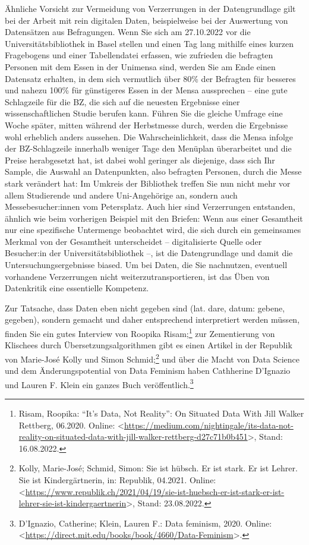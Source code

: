 \documentclass[
  letterpaper,
]{book}
\begin{document}
Ähnliche Vorsicht zur Vermeidung von Verzerrungen in der Datengrundlage
gilt bei der Arbeit mit rein digitalen Daten, beispielweise bei der
Auswertung von Datensätzen aus Befragungen. Wenn Sie sich am 27.10.2022
vor die Universitätsbibliothek in Basel stellen und einen Tag lang
mithilfe eines kurzen Fragebogens und einer Tabellendatei erfassen, wie
zufrieden die befragten Personen mit dem Essen in der Unimensa sind,
werden Sie am Ende einen Datensatz erhalten, in dem sich vermutlich über
80\% der Befragten für besseres und nahezu 100\% für günstigeres Essen
in der Mensa aussprechen -- eine gute Schlagzeile für die BZ, die sich
auf die neuesten Ergebnisse einer wissenschaftlichen Studie berufen
kann. Führen Sie die gleiche Umfrage eine Woche später, mitten während
der Herbstmesse durch, werden die Ergebnisse wohl erheblich anders
aussehen. Die Wahrscheinlichkeit, dass die Mensa infolge der
BZ-Schlagzeile innerhalb weniger Tage den Menüplan überarbeitet und die
Preise herabgesetzt hat, ist dabei wohl geringer als diejenige, dass
sich Ihr Sample, die Auswahl an Datenpunkten, also befragten Personen,
durch die Messe stark verändert hat: Im Umkreis der Bibliothek treffen
Sie nun nicht mehr vor allem Studierende und andere Uni-Angehörige an,
sondern auch Messebesucher:innen vom Petersplatz. Auch hier sind
Verzerrungen entstanden, ähnlich wie beim vorherigen Beispiel mit den
Briefen: Wenn aus einer Gesamtheit nur eine spezifische Untermenge
beobachtet wird, die sich durch ein gemeinsames Merkmal von der
Gesamtheit unterscheidet -- digitalisierte Quelle oder Besucher:in der
Universitätsbibliothek --, ist die Datengrundlage und damit die
Untersuchungsergebnisse biased. Um bei Daten, die Sie nachnutzen,
eventuell vorhandene Verzerrungen nicht weiterzutransportieren, ist das
Üben von Datenkritik eine essentielle Kompetenz.

Zur Tatsache, dass Daten eben nicht gegeben sind (lat. dare, datum:
gebene, gegeben), sondern gemacht und daher entsprechend interpretiert
werden müssen, finden Sie ein gutes Interview von Roopika
Risam;\footnote{Risam, Roopika: {``}{It}{'}s {Data}, {Not}
  {Reality}{''}: {On} {Situated} {Data} {With} {Jill} {Walker}
  {Rettberg}, 06.2020. Online:
  \textless{}\url{https://medium.com/nightingale/its-data-not-reality-on-situated-data-with-jill-walker-rettberg-d27c71b0b451}\textgreater,
  Stand: 16.08.2022.} zur Zementierung von Klischees durch
Übersetzungsalgorithmen gibt es einen Artikel in der Republik von
Marie-José Kolly und Simon Schmid;\footnote{Kolly, Marie-José; Schmid,
  Simon: Sie ist h{ü}bsch. {Er} ist stark. {Er} ist {Lehrer}. {Sie} ist
  {Kinderg{ä}rtnerin}, in: Republik, 04.2021. Online:
  \textless{}\url{https://www.republik.ch/2021/04/19/sie-ist-huebsch-er-ist-stark-er-ist-lehrer-sie-ist-kindergaertnerin}\textgreater,
  Stand: 23.08.2022.} und über die Macht von Data Science und dem
Änderungspotential von Data Feminism haben Cathherine D'Ignazio und
Lauren F. Klein ein ganzes Buch veröffentlich.\footnote{D'Ignazio,
  Catherine; Klein, Lauren F.: Data feminism, 2020. Online:
  \textless{}\url{https://direct.mit.edu/books/book/4660/Data-Feminism}\textgreater.}
\end{document}
